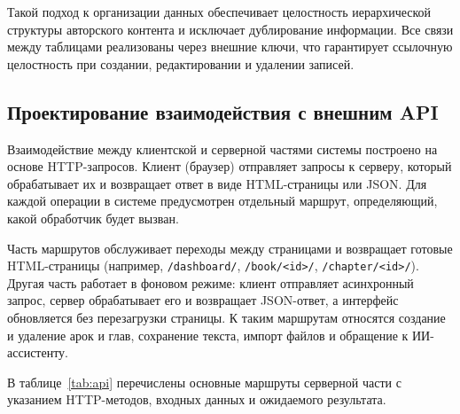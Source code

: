 Такой подход к организации данных обеспечивает целостность иерархической структуры авторского контента и исключает дублирование информации. Все связи между таблицами реализованы через внешние ключи, что гарантирует ссылочную целостность при создании, редактировании и удалении записей.

\subsection{Проектирование взаимодействия с внешним API}

Взаимодействие между клиентской и серверной частями системы построено на основе HTTP-запросов. Клиент (браузер) отправляет запросы к серверу, который обрабатывает их и возвращает ответ в виде HTML-страницы или JSON. Для каждой операции в системе предусмотрен отдельный маршрут, определяющий, какой обработчик будет вызван.

Часть маршрутов обслуживает переходы между страницами и возвращает готовые HTML-страницы (например, \texttt{/dashboard/}, \texttt{/book/<id>/}, \texttt{/chapter/<id>/}). Другая часть работает в фоновом режиме: клиент отправляет асинхронный запрос, сервер обрабатывает его и возвращает JSON-ответ, а интерфейс обновляется без перезагрузки страницы. К таким маршрутам относятся создание и удаление арок и глав, сохранение текста, импорт файлов и обращение к ИИ-ассистенту.

В таблице~\ref{tab:api} перечислены основные маршруты серверной части с указанием HTTP-методов, входных данных и ожидаемого результата.

